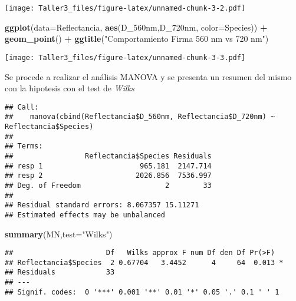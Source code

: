 \documentclass[
]{article}
\newenvironment{Shaded}{\begin{snugshade}}{\end{snugshade}}
\newcommand{\DataTypeTok}[1]{\textcolor[rgb]{0.13,0.29,0.53}{#1}}
\newcommand{\KeywordTok}[1]{\textcolor[rgb]{0.13,0.29,0.53}{\textbf{#1}}}
\newcommand{\NormalTok}[1]{#1}
\newcommand{\OperatorTok}[1]{\textcolor[rgb]{0.81,0.36,0.00}{\textbf{#1}}}
\newcommand{\StringTok}[1]{\textcolor[rgb]{0.31,0.60,0.02}{#1}}
\begin{document}
\texttt{[image: Taller3\_files/figure-latex/unnamed-chunk-3-2.pdf]}

\begin{Shaded}
\begin{Highlighting}[]
\KeywordTok{ggplot}\NormalTok{(}\DataTypeTok{data=}\NormalTok{Reflectancia, }\KeywordTok{aes}\NormalTok{(D_560nm,D_720nm, }\DataTypeTok{color=}\NormalTok{Species)) }\OperatorTok{+}\StringTok{ }\KeywordTok{geom_point}\NormalTok{() }\OperatorTok{+}\StringTok{ }\KeywordTok{ggtitle}\NormalTok{(}\StringTok{"Comportamiento Firma 560 nm vs 720 nm"}\NormalTok{)}
\end{Highlighting}
\end{Shaded}

\texttt{[image: Taller3\_files/figure-latex/unnamed-chunk-3-3.pdf]}

Se procede a realizar el análisis MANOVA y se presenta un resumen del
mismo con la hipotesis con el test de \emph{Wilks}

\begin{Shaded}
\end{Shaded}

\begin{verbatim}
## Call:
##    manova(cbind(Reflectancia$D_560nm, Reflectancia$D_720nm) ~ Reflectancia$Species)
## 
## Terms:
##                 Reflectancia$Species Residuals
## resp 1                       965.181  2147.714
## resp 2                      2026.856  7536.997
## Deg. of Freedom                    2        33
## 
## Residual standard errors: 8.067357 15.11271
## Estimated effects may be unbalanced
\end{verbatim}

\begin{Shaded}
\begin{Highlighting}[]
\KeywordTok{summary}\NormalTok{(MN,}\DataTypeTok{test=}\StringTok{"Wilks"}\NormalTok{)}
\end{Highlighting}
\end{Shaded}

\begin{verbatim}
##                      Df   Wilks approx F num Df den Df Pr(>F)  
## Reflectancia$Species  2 0.67704   3.4452      4     64  0.013 *
## Residuals            33                                        
## ---
## Signif. codes:  0 '***' 0.001 '**' 0.01 '*' 0.05 '.' 0.1 ' ' 1
\end{verbatim}
\end{document}
